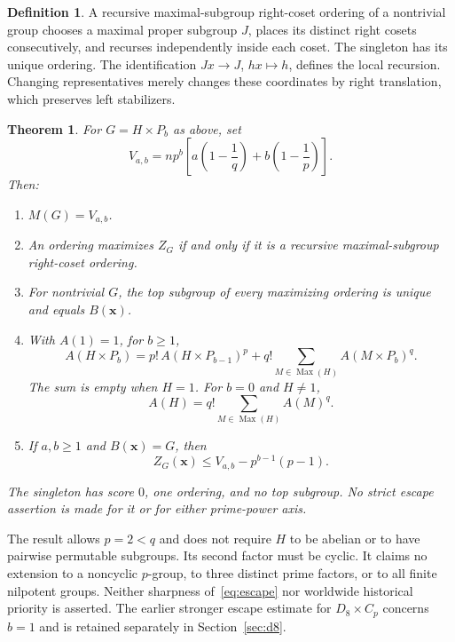 \documentclass[11pt,letterpaper]{article}
\newtheorem{theorem}{Theorem}
\theoremstyle{definition}\newtheorem{definition}{Definition}
\newcommand{\Max}{\operatorname{Max}}
\begin{document}
\begin{definition}
A recursive maximal-subgroup right-coset ordering of a nontrivial group chooses a maximal proper subgroup $J$, places its distinct right cosets consecutively, and recurses independently inside each coset. The singleton has its unique ordering. The identification $Jx\to J$, $hx\mapsto h$, defines the local recursion. Changing representatives merely changes these coordinates by right translation, which preserves left stabilizers.
\end{definition}

\begin{theorem}\label{thm:main}
For $G=H\times P_b$ as above, set
\begin{equation}
V_{a,b}=np^b\left[a\left(1-\frac1q\right)+b\left(1-\frac1p\right)\right].\label{eq:value}
\end{equation}
Then:
\begin{enumerate}
\item $M(G)=V_{a,b}$.
\item An ordering maximizes $Z_G$ if and only if it is a recursive maximal-subgroup right-coset ordering.
\item For nontrivial $G$, the top subgroup of every maximizing ordering is unique and equals $B(\mathbf{x})$.
\item With $A(1)=1$, for $b\ge1$,
\begin{equation}
A(H\times P_b)=p!\,A(H\times P_{b-1})^p
 +q!\sum_{M\in\Max(H)}A(M\times P_b)^q.\label{eq:count}
\end{equation}
The sum is empty when $H=1$. For $b=0$ and $H\ne1$,
\begin{equation}
A(H)=q!\sum_{M\in\Max(H)}A(M)^q.\label{eq:qcount}
\end{equation}
\item If $a,b\ge1$ and $B(\mathbf{x})=G$, then
\begin{equation}
Z_G(\mathbf{x})\le V_{a,b}-p^{b-1}(p-1).\label{eq:escape}
\end{equation}
\end{enumerate}
The singleton has score $0$, one ordering, and no top subgroup. No strict escape assertion is made for it or for either prime-power axis.
\end{theorem}

The result allows $p=2<q$ and does not require $H$ to be abelian or to have pairwise permutable subgroups. Its second factor must be cyclic. It claims no extension to a noncyclic $p$-group, to three distinct prime factors, or to all finite nilpotent groups. Neither sharpness of~\eqref{eq:escape} nor worldwide historical priority is asserted. The earlier stronger escape estimate for $D_8\times C_p$ concerns $b=1$ and is retained separately in Section~\ref{sec:d8}.
\end{document}
